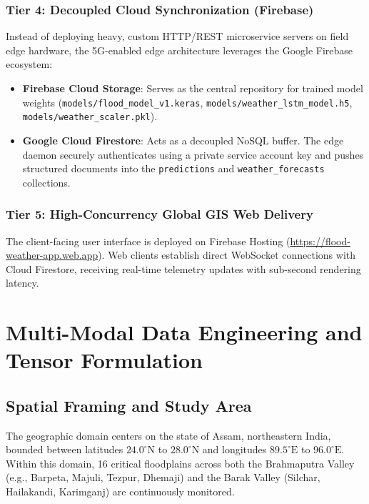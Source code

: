 \documentclass[12pt,a4paper,oneside]{report}
\begin{document}
\subsection{Tier 4: Decoupled Cloud Synchronization (Firebase)}
Instead of deploying heavy, custom HTTP/REST microservice servers on field edge hardware, the 5G-enabled edge architecture leverages the Google Firebase ecosystem:
\begin{itemize}
    \item \textbf{Firebase Cloud Storage}: Serves as the central repository for trained model weights (\texttt{models/flood\_model\_v1.keras}, \texttt{models/weather\_lstm\_model.h5}, \texttt{models/weather\_scaler.pkl}).
    \item \textbf{Google Cloud Firestore}: Acts as a decoupled NoSQL buffer. The edge daemon securely authenticates using a private service account key and pushes structured documents into the \texttt{predictions} and \texttt{weather\_forecasts} collections.
\end{itemize}

\subsection{Tier 5: High-Concurrency Global GIS Web Delivery}
The client-facing user interface is deployed on Firebase Hosting (\url{https://flood-weather-app.web.app}). Web clients establish direct WebSocket connections with Cloud Firestore, receiving real-time telemetry updates with sub-second rendering latency.

\chapter{Multi-Modal Data Engineering and Tensor Formulation}
\label{chap:data_eng}

\section{Spatial Framing and Study Area}
The geographic domain centers on the state of Assam, northeastern India, bounded between latitudes $24.0^\circ\text{N}$ to $28.0^\circ\text{N}$ and longitudes $89.5^\circ\text{E}$ to $96.0^\circ\text{E}$. Within this domain, 16 critical floodplains across both the Brahmaputra Valley (e.g., Barpeta, Majuli, Tezpur, Dhemaji) and the Barak Valley (Silchar, Hailakandi, Karimganj) are continuously monitored.
\end{document}
